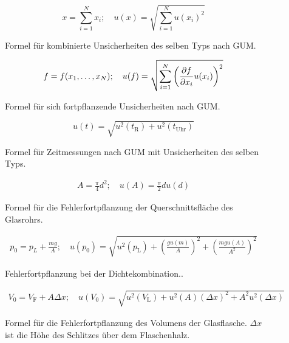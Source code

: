 \begin{figure}[h]
	\begin{equation*}
		x = \sum_{i=1}^{N} x_i
		;\quad
		u(x) = \sqrt{\sum_{i = 1}^{N} u(x_i)^2}
	\end{equation*}
	\caption{Formel für kombinierte Unsicherheiten des selben Typs nach GUM.}
	\label{fig:GUM_combine}
\end{figure}

\begin{figure}[h]
	\begin{align*}
		f = f(x_1, \dots , x_N)
		;\quad
		u(f) = \sqrt{\sum_{i = 1}^{N}\left(\pdv{f}{x_i} u(x_i)\right) ^2}
	\end{align*}
	\caption{Formel für sich fortpflanzende Unsicherheiten nach GUM.}
	\label{fig:GUM_formula}
\end{figure}

\begin{figure}[h]
	\begin{equation*}
		u(t) = \sqrt{u^2(t_\text{R}) + u^2(t_\text{Uhr})}
	\end{equation*}
	\caption{Formel für Zeitmessungen nach GUM mit Unsicherheiten des selben Typs.} 
	\label{unc:time}
\end{figure}

\begin{figure}[h]
	\begin{align*}
		A = \frac{\pi}{4} d^2
		;\quad
		u(A) = \frac{\pi}{2} d u(d)
	\end{align*}
	\caption{Formel für die Fehlerfortpflanzung der Querschnittsfläche des Glasrohrs.}
	\label{unc:querschnitt}
\end{figure}

\begin{figure}[h]
	\begin{align*}
		p_0 = p_{L} + \frac{m g}{A}
		;\quad
		u(p_0) = \sqrt{u^2(p_\text{L}) + \left( \frac{g u(m)}{A}\right)^2 + \left( \frac{m g u(A)}{A^2}\right)^2}
	\end{align*}
	\caption{Fehlerfortpflanzung bei der Dichtekombination..}
	\label{unc:dichte}
\end{figure}

\begin{figure}[h]
	\begin{align*}
		V_0 = V_\text{F} + A \Delta x
		;\quad
		u(V_0) = \sqrt{u^2(V_\text{L}) + u^2(A) (\Delta x)^2 + A^2 u^2(\Delta x)}
	\end{align*}
	\caption{Formel für die Fehlerfortpflanzung des Volumens der Glasflasche. $\Delta x$ ist die Höhe des Schlitzes über dem Flaschenhalz.}
	\label{unc:volumen}
\end{figure}

